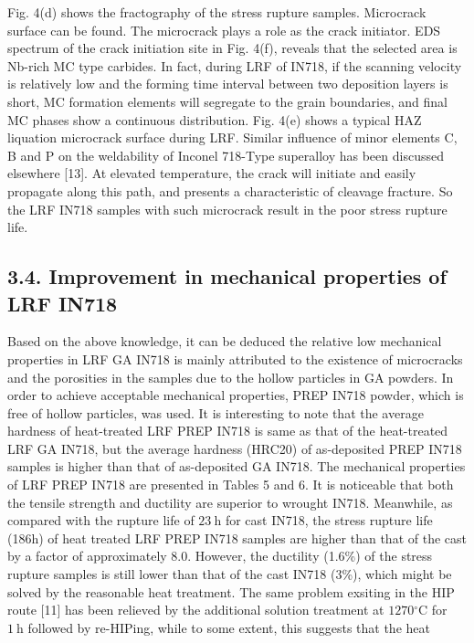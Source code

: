 \documentclass[10pt]{article}
\begin{document}
Fig. 4(d) shows the fractography of the stress rupture samples. Microcrack surface can be found. The microcrack plays a role as the crack initiator. EDS spectrum of the crack initiation site in Fig. 4(f), reveals that the selected area is Nb-rich MC type carbides. In fact, during LRF of IN718, if the scanning velocity is relatively low and the forming time interval between two deposition layers is short, $\mathrm{MC}$ formation elements will segregate to the grain boundaries, and final $\mathrm{MC}$ phases show a continuous distribution. Fig. 4(e) shows a typical HAZ liquation microcrack surface during LRF. Similar influence of minor elements C, B and P on the weldability of Inconel 718-Type superalloy has been discussed elsewhere [13]. At elevated temperature, the crack will initiate and easily propagate along this path, and presents a characteristic of cleavage fracture. So the LRF IN718 samples with such microcrack result in the poor stress rupture life.

\subsection*{3.4. Improvement in mechanical properties of LRF IN718}
Based on the above knowledge, it can be deduced the relative low mechanical properties in LRF GA IN718 is mainly attributed to the existence of microcracks and the porosities in the samples due to the hollow particles in GA powders. In order to achieve acceptable mechanical properties, PREP IN718 powder, which is free of hollow particles, was used. It is interesting to note that the average hardness of heat-treated LRF PREP IN718 is same as that of the heat-treated LRF GA IN718, but the average hardness (HRC20) of as-deposited PREP IN718 samples is higher than that of as-deposited GA IN718. The mechanical properties of LRF PREP IN718 are presented in Tables 5 and 6. It is noticeable that both the tensile strength and ductility are superior to wrought IN718. Meanwhile, as compared with the rupture life of $23 \mathrm{~h}$ for cast IN718, the stress rupture life (186h) of heat treated LRF PREP IN718 samples are higher than that of the cast by a factor of approximately 8.0. However, the ductility (1.6\%) of the stress rupture samples is still lower than that of the cast IN718 (3\%), which might be solved by the reasonable heat treatment. The same problem exsiting in the HIP route [11] has been relieved by the additional solution treatment at $1270{ }^{\circ} \mathrm{C}$ for $1 \mathrm{~h}$ followed by re-HIPing, while to some extent, this suggests that the heat
\end{document}
